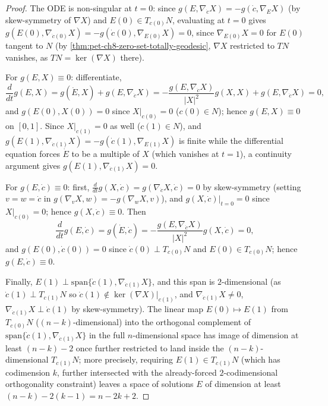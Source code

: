 \begin{proof}
  The ODE is non-singular at $t=0$: since
  $g(E,\nabla_{\dot c}X)=-g(\dot c,\nabla_EX)$ (by skew-symmetry of $\nabla X$)
  and $E(0)\in T_{c(0)}N$, evaluating at $t=0$ gives
  $g(E(0),\nabla_{\dot c(0)}X)=-g(\dot c(0),\nabla_{E(0)}X)=0$, since
  $\nabla_{E(0)}X=0$ for $E(0)$ tangent to $N$ (by \cref{thm:pet-ch8-zero-set-totally-geodesic},
  $\nabla X$ restricted to $TN$ vanishes, as $TN=\ker(\nabla X)$ there).

  For $g(E,X)\equiv0$: differentiate,
  \[
    \frac{d}{dt}g(E,X)=g(\dot E,X)+g(E,\nabla_{\dot c}X)
    =-\frac{g(E,\nabla_{\dot c}X)}{|X|^2}g(X,X)+g(E,\nabla_{\dot c}X)=0,
  \]
  and $g(E(0),X(0))=0$ since $X|_{c(0)}=0$ ($c(0)\in N$); hence $g(E,X)\equiv0$
  on $[0,1]$. Since $X|_{c(1)}=0$ as well ($c(1)\in N$), and
  $g(E(1),\nabla_{\dot c(1)}X)=-g(\dot c(1),\nabla_{E(1)}X)$ is finite while the
  differential equation forces $\dot E$ to be a multiple of $X$ (which vanishes
  at $t=1$), a continuity argument gives $g(E(1),\nabla_{\dot c(1)}X)=0$.

  For $g(E,\dot c)\equiv0$: first, $\frac{d}{dt}g(X,\dot c)=g(\nabla_{\dot c}X,\dot c)=0$
  by skew-symmetry (setting $v=w=\dot c$ in
  $g(\nabla_vX,w)=-g(\nabla_wX,v)$), and $g(X,\dot c)|_{t=0}=0$ since
  $X|_{c(0)}=0$; hence $g(X,\dot c)\equiv0$. Then
  \[
    \frac{d}{dt}g(E,\dot c)=g(\dot E,\dot c)=-\frac{g(E,\nabla_{\dot c}X)}{|X|^2}g(X,\dot c)=0,
  \]
  and $g(E(0),\dot c(0))=0$ since $\dot c(0)\perp T_{c(0)}N$ and $E(0)\in T_{c(0)}N$;
  hence $g(E,\dot c)\equiv0$.

  Finally, $E(1)\perp\mathrm{span}\{\dot c(1),\nabla_{\dot c(1)}X\}$, and this
  span is $2$-dimensional (as $\dot c(1)\perp T_{c(1)}N$ so $\dot c(1)\notin\ker(\nabla X)|_{c(1)}$,
  and $\nabla_{\dot c(1)}X\ne0$, $\nabla_{\dot c(1)}X\perp\dot c(1)$ by
  skew-symmetry). The linear map $E(0)\mapsto E(1)$ from $T_{c(0)}N$
  ($(n-k)$-dimensional) into the orthogonal complement of $\mathrm{span}\{\dot c(1),\nabla_{\dot c(1)}X\}$
  in the full $n$-dimensional space has image of dimension at least
  $(n-k)-2$ once further restricted to land inside the $(n-k)$-dimensional
  $T_{c(1)}N$; more precisely, requiring $E(1)\in T_{c(1)}N$ (which has
  codimension $k$, further intersected with the already-forced $2$-codimensional
  orthogonality constraint) leaves a space of solutions $E$ of dimension at
  least $(n-k)-2(k-1)=n-2k+2$.
\end{proof}

